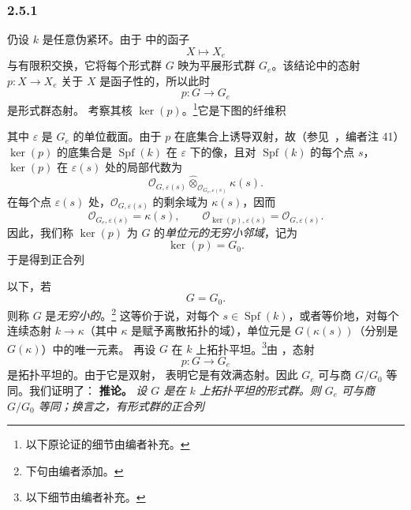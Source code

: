 
\subsubsection*{2.5.1}
\label{sga3:VIIB:2.5.1}
仍设 \(k\) 是任意伪紧环。由于  中的函子
\[
  X\longmapsto X_e
\]
与有限积交换，它将每个形式群 \(G\) 映为平展形式群 \(G_e\)。该结论中的态射 \(p:X\to X_e\) 关于 \(X\) 是函子性的，所以此时
\[
  p:G\longrightarrow G_e
\]
是形式群态射。
考察其核 \(\ker(p)\)。\footnote{%
\label{sga3:VIIB:nde:97}以下原论证的细节由编者补充。}它是下图的纤维积
\begin{center}
  \label{sga3:VIIB:2.5.1:kernel-fiber-square}
  
\end{center}
其中 \(\varepsilon\) 是 \(G_e\) 的单位截面。由于 \(p\) 在底集合上诱导双射，故\textup{（参见\ ，编者注 41）}\(\ker(p)\) 的底集合是 \(\operatorname{Spf}(k)\) 在 \(\varepsilon\) 下的像，且对 \(\operatorname{Spf}(k)\) 的每个点 \(s\)，\(\ker(p)\) 在 \(\varepsilon(s)\) 处的局部代数为
\[
  \mathcal O_{G,\varepsilon(s)}
  \widehat\otimes_{\mathcal O_{G_e,\varepsilon(s)}}
  \kappa(s).
\]
在每个点 \(\varepsilon(s)\) 处，\(\mathcal O_{G,\varepsilon(s)}\) 的剩余域为 \(\kappa(s)\)，因而
\[
  \mathcal O_{G_e,\varepsilon(s)}=\kappa(s),
  \qquad
  \mathcal O_{\ker(p),\varepsilon(s)}
  =
  \mathcal O_{G,\varepsilon(s)}.
\]
因此，我们称 \(\ker(p)\) 为 \(G\) 的\emph{单位元的无穷小邻域}，记为
\[
  \ker(p)=G_0.
\]
于是得到正合列
\begin{center}
  \label{sga3:VIIB:2.5.1:infinitesimal-exact-sequence}
  
\end{center}
以下，若
\[
  G=G_0.
\]
则称 \(G\) 是\emph{无穷小的}。\footnote{\label{sga3:VIIB:nde:98}下句由编者添加。}
这等价于说，对每个 \(s\in\operatorname{Spf}(k)\)，或者等价地，对每个连续态射 \(k\to\kappa\)（其中 \(\kappa\) 是赋予离散拓扑的域），单位元是 \(G(\kappa(s))\)（分别是 \(G(\kappa)\)）中的唯一元素。
再设 \(G\) 在 \(k\) 上拓扑平坦。\footnote{\label{sga3:VIIB:nde:99}以下细节由编者补充。}由 ，态射
\[
  p:G\longrightarrow G_e
\]
是拓扑平坦的。由于它是双射， 表明它是有效满态射。因此 \(G_e\) 可与商 \(G/G_0\) 等同。我们证明了：
\medskip
\noindent\textbf{推论。}
\label{sga3:VIIB:2.5.1:corollary}
{\itshape 设 \(G\) 是在 \(k\) 上拓扑平坦的形式群。则 \(G_e\) 可与商 \(G/G_0\) 等同；换言之，有形式群的正合列}
\begin{center}
  \label{sga3:VIIB:2.5.1:short-exact-sequence}
  
\end{center}
